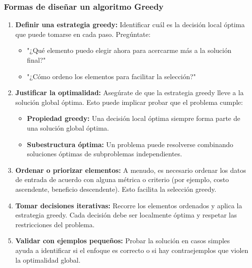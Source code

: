 \subsubsection{Formas de diseñar un algoritmo Greedy}  
\begin{enumerate}  
  \item \textbf{Definir una estrategia greedy:} Identificar cuál es la decisión local óptima que puede tomarse en cada paso. Pregúntate:  
  \begin{itemize}  
    \item "¿Qué elemento puedo elegir ahora para acercarme más a la solución final?"  
    \item "¿Cómo ordeno los elementos para facilitar la selección?"  
  \end{itemize}  

  \item \textbf{Justificar la optimalidad:} Asegúrate de que la estrategia greedy lleve a la solución global óptima. Esto puede implicar probar que el problema cumple:  
  \begin{itemize}  
    \item \textbf{Propiedad greedy:} Una decisión local óptima siempre forma parte de una solución global óptima.  
    \item \textbf{Subestructura óptima:} Un problema puede resolverse combinando soluciones óptimas de subproblemas independientes.  
  \end{itemize}  

  \item \textbf{Ordenar o priorizar elementos:} A menudo, es necesario ordenar los datos de entrada de acuerdo con alguna métrica o criterio (por ejemplo, costo ascendente, beneficio descendente). Esto facilita la selección greedy.  

  \item \textbf{Tomar decisiones iterativas:} Recorre los elementos ordenados y aplica la estrategia greedy. Cada decisión debe ser localmente óptima y respetar las restricciones del problema.  

  \item \textbf{Validar con ejemplos pequeños:} Probar la solución en casos simples ayuda a identificar si el enfoque es correcto o si hay contraejemplos que violen la optimalidad global.  
\end{enumerate}  

